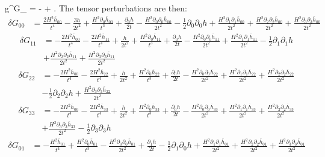 \documentclass[10pt,letterpaper]{article}
\begin{document}
\be
	g^{\mu\nu}\delta G_{\mu\nu} = -  + .
\ee
The tensor perturbations are then:
\begin{align}
	\delta  G_{00} &= \frac{2 H^2 \overline{h}_{00}}{t^4} -  \frac{3 h}{2 t^2} + \frac{H^2 \partial_{0}\overline{h}_{00}}{t^3} + \frac{\partial_{0}h}{2 t} -  \frac{H^2 \partial_{0}\partial_{0}\overline{h}_{00}}{2 t^2} -  \tfrac{1}{2} \partial_{0}\partial_{0}h + \frac{H^2 \partial_{1}\partial_{1}\overline{h}_{00}}{2 t^2} + \frac{H^2 \partial_{2}\partial_{2}\overline{h}_{00}}{2 t^2} + \frac{H^2 \partial_{3}\partial_{3}\overline{h}_{00}}{2 t^2}
\end{align}
\begin{align}
	\delta  G_{11} &= - \frac{2 H^2 \overline{h}_{00}}{t^4} -  \frac{2 H^2 \overline{h}_{11}}{t^4} + \frac{h}{2 t^2} + \frac{H^2 \partial_{0}\overline{h}_{11}}{t^3} + \frac{\partial_{0}h}{2 t} -  \frac{H^2 \partial_{0}\partial_{0}\overline{h}_{11}}{2 t^2} + \frac{H^2 \partial_{1}\partial_{1}\overline{h}_{11}}{2 t^2} -  \tfrac{1}{2} \partial_{1}\partial_{1}h \\
&+ \frac{H^2 \partial_{2}\partial_{2}\overline{h}_{11}}{2 t^2} + \frac{H^2 \partial_{3}\partial_{3}\overline{h}_{11}}{2 t^2}
\end{align}
\begin{align}
	\delta G_{22} &=- \frac{2 H^2 \overline{h}_{00}}{t^4} -  \frac{2 H^2 \overline{h}_{22}}{t^4} + \frac{h}{2 t^2} + \frac{H^2 \partial_{0}\overline{h}_{22}}{t^3} + \frac{\partial_{0}h}{2 t} -  \frac{H^2 \partial_{0}\partial_{0}\overline{h}_{22}}{2 t^2} + \frac{H^2 \partial_{1}\partial_{1}\overline{h}_{22}}{2 t^2} + \frac{H^2 \partial_{2}\partial_{2}\overline{h}_{22}}{2 t^2} \\
&-  \tfrac{1}{2} \partial_{2}\partial_{2}h + \frac{H^2 \partial_{3}\partial_{3}\overline{h}_{22}}{2 t^2}
\end{align}
\begin{align}
	\delta G_{33} &= - \frac{2 H^2 \overline{h}_{00}}{t^4} -  \frac{2 H^2 \overline{h}_{33}}{t^4} + \frac{h}{2 t^2} + \frac{H^2 \partial_{0}\overline{h}_{33}}{t^3} + \frac{\partial_{0}h}{2 t} -  \frac{H^2 \partial_{0}\partial_{0}\overline{h}_{33}}{2 t^2} + \frac{H^2 \partial_{1}\partial_{1}\overline{h}_{33}}{2 t^2} + \frac{H^2 \partial_{2}\partial_{2}\overline{h}_{33}}{2 t^2} \\
&+ \frac{H^2 \partial_{3}\partial_{3}\overline{h}_{33}}{2 t^2} -  \tfrac{1}{2} \partial_{3}\partial_{3}h
\end{align}
\begin{align}
	\delta G_{01} &=- \frac{H^2 \overline{h}_{01}}{t^4} + \frac{H^2 \partial_{0}\overline{h}_{01}}{t^3} -  \frac{H^2 \partial_{0}\partial_{0}\overline{h}_{01}}{2 t^2} + \frac{\partial_{1}h}{2 t} -  \tfrac{1}{2} \partial_{1}\partial_{0}h + \frac{H^2 \partial_{1}\partial_{1}\overline{h}_{01}}{2 t^2} + \frac{H^2 \partial_{2}\partial_{2}\overline{h}_{01}}{2 t^2} + \frac{H^2 \partial_{3}\partial_{3}\overline{h}_{01}}{2 t^2}
\end{align}
\end{document}
